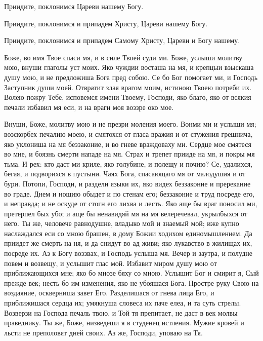 \mychapterending

 

\begin{mymulticols}
 


 Приидите, поклонимся Цареви нашему Богу.



Приидите, поклонимся и припадем Христу, Цареви нашему Богу.



Приидите, поклонимся и припадем Самому Христу, Цареви и Богу нашему.



Боже, во имя Твое спаси мя, и в силе Твоей суди ми. Боже, услыши молитву мою, внуши глаголы уст моих. Яко чуждии восташа на мя, и крепцыи взыскаша душу мою, и не предложиша Бога пред собою. Се бо Бог помогает ми, и Господь Заступник души моей. Отвратит злая врагом моим, истиною Твоею потреби их. Волею пожру Тебе, исповемся имени Твоему, Господи, яко благо, яко от всякия печали избавил мя еси, и на враги моя воззре око мое.




Внуши, Боже, молитву мою и не презри моления моего. Вонми ми и услыши мя; возскорбех печалию моею, и смятохся от гласа вражия и от стужения грешнича, яко уклониша на мя беззаконие, и во гневе враждоваху ми. Сердце мое смятеся во мне, и боязнь смерти нападе на мя. Страх и трепет прииде на мя, и покры мя тьма. И рех: кто даст ми криле, яко голубине, и полещу и почию? Се, удалихся, бегая, и подворихся в пустыни. Чаях Бога, спасающаго мя от малодушия и от бури. Потопи, Господи, и раздели языки их, яко видех беззаконие и пререкание во граде. Днем и нощию обыдет и по стенам его; беззаконие и труд посреде его, и неправда; и не оскуде от стогн его лихва и лесть. Яко аще бы враг поносил ми, претерпел бых убо; и аще бы ненавидяй мя на мя велеречевал, укрылбыхся от него. Ты же, человече равнодушне, владыко мой и знаемый мой; иже купно наслаждался еси со мною брашен, в дому Божии ходихом единомышлением. Да приидет же смерть на ня, и да снидут во ад живи; яко лукавство в жилищах их, посреде их. Аз к Богу воззвах, и Господь услыша мя. Вечер и заутра, и полудне повем и возвещу, и услышит глас мой. Избавит миром душу мою от приближающихся мне; яко бо мнозе бяху со мною. Услышит Бог и смирит я, Сый прежде век; несть бо им изменения, яко не убояшася Бога. Простре руку Свою на воздаяние, оскверниша завет Его. Разделишася от гнева лица Его, и приближишася сердца их; умякнуша словеса их паче елеа, и та суть стрелы. Возверзи на Господа печаль твою, и Той тя препитает, не даст в век молвы праведнику. Ты же, Боже, низведеши я в студенец истления. Мужие кровей и льсти не преполовят дней своих. Аз же, Господи, уповаю на Тя.



\end{mymulticols}
